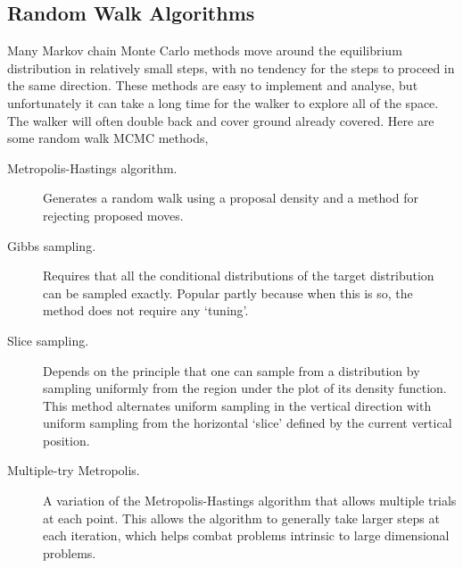 \subsection{Random Walk Algorithms}
Many Markov chain Monte Carlo methods move around the equilibrium distribution in relatively small steps, with no tendency for the steps to proceed in the same direction. These methods are easy to implement and analyse, but unfortunately it can take a long time for the walker to explore all of the space. The walker will often double back and cover ground already covered. Here are some random walk MCMC methods,
\begin{description}
\item[Metropolis-Hastings algorithm.] Generates a random walk using a proposal density and a method for rejecting proposed moves.
\item[Gibbs sampling.] Requires that all the conditional distributions of the target distribution can be sampled exactly. Popular partly because when this is so, the method does not require any `tuning'.
\item[Slice sampling.] Depends on the principle that one can sample from a distribution by sampling uniformly from the region under the plot of its density function. This method alternates uniform sampling in the vertical direction with uniform sampling from the horizontal `slice' defined by the current vertical position.
\item[Multiple-try Metropolis.] A variation of the Metropolis-Hastings algorithm that allows multiple trials at each point. This allows the algorithm to generally take larger steps at each iteration, which helps combat problems intrinsic to large dimensional problems.
\end{description}